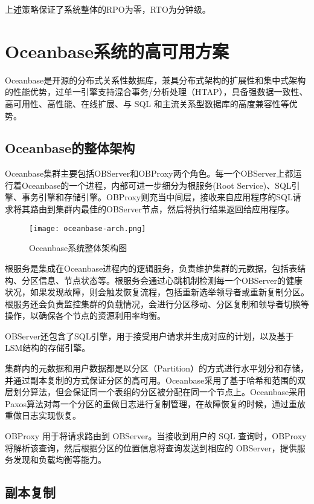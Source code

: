 上述策略保证了系统整体的RPO为零，RTO为分钟级。


\section{Oceanbase系统的高可用方案}

Oceanbase是开源的分布式关系性数据库，兼具分布式架构的扩展性和集中式架构的性能优势，过单一引擎支持混合事务/分析处理（HTAP），具备强数据一致性、高可用性、高性能、在线扩展、与 SQL 和主流关系型数据库的高度兼容性等优势。

\subsection{Oceanbase的整体架构}

Oceanbase集群主要包括OBServer和OBProxy两个角色。每一个OBServer上都运行着Oceanbase的一个进程，内部可进一步细分为根服务(Root Service)、SQL引擎、事务引擎和存储引擎。OBProxy则充当中间层，接收来自应用程序的SQL请求将其路由到集群内最佳的OBServer节点，然后将执行结果返回给应用程序。

\begin{figure}
  \centering
  \texttt{[image: oceanbase-arch.png]}
  \caption{Oceanbase系统整体架构图}
  \label{fig:oceanbase-arch}
\end{figure}

根服务是集成在Oceanbase进程内的逻辑服务，负责维护集群的元数据，包括表结构、分区信息、节点状态等。根服务会通过心跳机制检测每一个OBServer的健康状况，如果发现故障，则会触发恢复流程，包括重新选举领导者或重新复制分区。根服务还会负责监控集群的负载情况，会进行分区移动、分区复制和领导者切换等操作，以确保各个节点的资源利用率均衡。

OBServer还包含了SQL引擎，用于接受用户请求并生成对应的计划，以及基于LSM结构的存储引擎。

集群内的元数据和用户数据都是以分区（Partition）的方式进行水平划分和存储，并通过副本复制的方式保证分区的高可用。Oceanbase采用了基于哈希和范围的双层划分算法，但会保证同一个表组的分区被分配在同一个节点上。Oceanbase采用Paxos算法对每一个分区的重做日志进行复制管理，在故障恢复的时候，通过重放重做日志实现恢复。

OBProxy 用于将请求路由到 OBServer。当接收到用户的 SQL 查询时，OBProxy 将解析该查询，然后根据分区的位置信息将查询发送到相应的 OBServer，提供服务发现和负载均衡等能力。


\subsection{副本复制}

